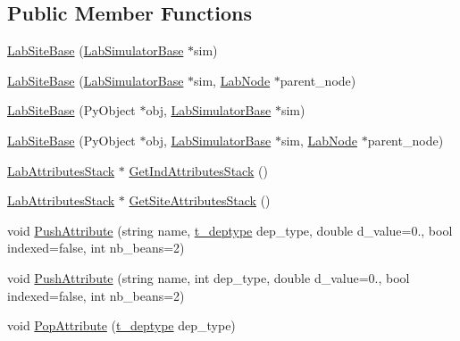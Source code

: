 \subsection*{Public Member Functions}
\begin{DoxyCompactItemize}
\item 
\hyperlink{classelps_1_1_lab_site_base_ab051b072f05ac8a16bd51a2331c8ba8c}{Lab\+Site\+Base} (\hyperlink{classelps_1_1_lab_simulator_base}{Lab\+Simulator\+Base} $\ast$sim)
\item 
\hyperlink{classelps_1_1_lab_site_base_afe1c00c934b0904cfefd839fe391ce0e}{Lab\+Site\+Base} (\hyperlink{classelps_1_1_lab_simulator_base}{Lab\+Simulator\+Base} $\ast$sim, \hyperlink{classelps_1_1_lab_node}{Lab\+Node} $\ast$parent\+\_\+node)
\item 
\hyperlink{classelps_1_1_lab_site_base_a5ca26d25599b20c2c48b264929e29a78}{Lab\+Site\+Base} (Py\+Object $\ast$obj, \hyperlink{classelps_1_1_lab_simulator_base}{Lab\+Simulator\+Base} $\ast$sim)
\item 
\hyperlink{classelps_1_1_lab_site_base_a3d9c9341cbb58721743954e2e886afeb}{Lab\+Site\+Base} (Py\+Object $\ast$obj, \hyperlink{classelps_1_1_lab_simulator_base}{Lab\+Simulator\+Base} $\ast$sim, \hyperlink{classelps_1_1_lab_node}{Lab\+Node} $\ast$parent\+\_\+node)
\item 
\hyperlink{classelps_1_1_lab_attributes_stack}{Lab\+Attributes\+Stack} $\ast$ \hyperlink{classelps_1_1_lab_site_base_a558b5b903f6cfc25cdfb4f3368693b27}{Get\+Ind\+Attributes\+Stack} ()
\item 
\hyperlink{classelps_1_1_lab_attributes_stack}{Lab\+Attributes\+Stack} $\ast$ \hyperlink{classelps_1_1_lab_site_base_a60aa1b12a8124c731f4364059f5f83ed}{Get\+Site\+Attributes\+Stack} ()
\item 
void \hyperlink{classelps_1_1_lab_site_base_a5e67e2b6ae66b57d0b7d601aec09d2f5}{Push\+Attribute} (string name, \hyperlink{classelps_1_1_lab_site_base_a8ec08fafa015dfa53827d985608afe58}{t\+\_\+deptype} dep\+\_\+type, double d\+\_\+value=0., bool indexed=false, int nb\+\_\+beans=2)
\item 
void \hyperlink{classelps_1_1_lab_site_base_aa15bc544668860be639149ffabfb5888}{Push\+Attribute} (string name, int dep\+\_\+type, double d\+\_\+value=0., bool indexed=false, int nb\+\_\+beans=2)
\item 
void \hyperlink{classelps_1_1_lab_site_base_a64a3f5fafc774289abab1c90361e2a45}{Pop\+Attribute} (\hyperlink{classelps_1_1_lab_site_base_a8ec08fafa015dfa53827d985608afe58}{t\+\_\+deptype} dep\+\_\+type)

\end{DoxyCompactItemize}
